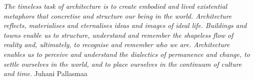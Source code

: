 \maketitle
\makedeclaration

\begin{flushleft}

\textit{The timeless task of architecture is to create embodied and lived existential metaphors that concretise and structure our being in the world. Architecture reflects, materialises and eternalises ideas and images of ideal life. Buildings and towns enable us to structure, understand and remember the shapeless flow of reality and, ultimately, to recognise and remember who we are. Architecture enables us to perceive and understand the dialectics of permanence and change, to settle ourselves in the world, and to place ourselves in the continuum of culture and time.}\newline
Juhani Pallasmaa 
\end{flushleft}




